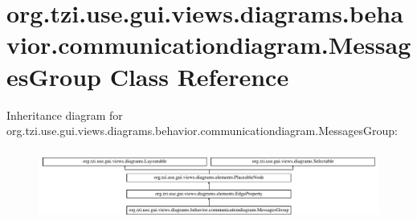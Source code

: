 \hypertarget{classorg_1_1tzi_1_1use_1_1gui_1_1views_1_1diagrams_1_1behavior_1_1communicationdiagram_1_1_messages_group}{\section{org.\-tzi.\-use.\-gui.\-views.\-diagrams.\-behavior.\-communicationdiagram.\-Messages\-Group Class Reference}
\label{classorg_1_1tzi_1_1use_1_1gui_1_1views_1_1diagrams_1_1behavior_1_1communicationdiagram_1_1_messages_group}
}
Inheritance diagram for org.\-tzi.\-use.\-gui.\-views.\-diagrams.\-behavior.\-communicationdiagram.\-Messages\-Group\-:\begin{figure}[H]
\begin{center}
\leavevmode
\includegraphics[height=2.367865cm]{classorg_1_1tzi_1_1use_1_1gui_1_1views_1_1diagrams_1_1behavior_1_1communicationdiagram_1_1_messages_group}
\end{center}
\end{figure}
